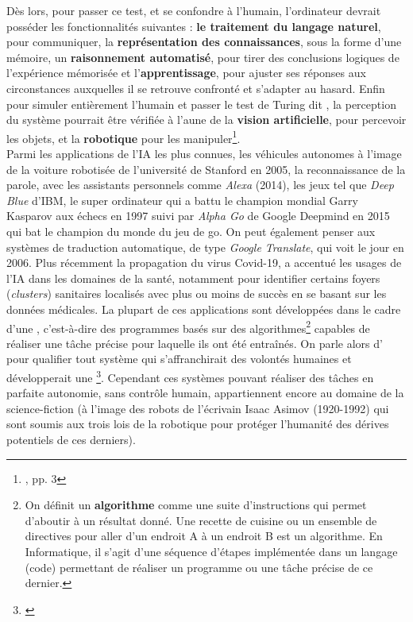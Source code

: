 Dès lors, pour passer ce test, et se confondre à l'humain, l'ordinateur devrait posséder les fonctionnalités suivantes : \textbf{le traitement du langage naturel}, pour communiquer, la \textbf{représentation des connaissances}, sous la forme d'une mémoire, un \textbf{raisonnement automatisé}, pour tirer des conclusions logiques de l'expérience mémorisée et l'\textbf{apprentissage}, pour ajuster ses réponses aux circonstances auxquelles il se retrouve confronté et s'adapter au hasard. Enfin pour simuler entièrement l'humain et passer le test de Turing dit , la perception du système pourrait être vérifiée à l'aune de la \textbf{vision artificielle}, pour percevoir les objets, et la \textbf{robotique} pour les manipuler\footnote{\cite{russell_intelligence_2010}, pp. 3}.\\

Parmi les applications de l'IA les plus connues, les véhicules autonomes à l'image de la voiture robotisée de l'université de Stanford en 2005, la reconnaissance de la parole, avec les assistants personnels comme \textit{Alexa} (2014), les jeux tel que \textit{Deep Blue} d'IBM, le super ordinateur qui a battu le champion mondial Garry Kasparov aux échecs en 1997 suivi par \textit{Alpha Go} de Google Deepmind en 2015  qui bat le champion du monde du jeu de go. On peut également penser aux systèmes de traduction automatique, de type \textit{Google Translate}, qui voit le jour en 2006. Plus récemment la propagation du virus Covid-19, a accentué les usages de l'IA dans les domaines de la santé, notamment pour identifier certains foyers (\textit{clusters}) sanitaires localisés avec plus ou moins de succès en se basant sur les données médicales.
\newpage
La plupart de ces applications sont développées dans le cadre d'une , c'est-à-dire des programmes basés sur des algorithmes\footnote{On définit un \textbf{algorithme} comme une suite d'instructions qui permet d'aboutir à un résultat donné. Une recette de cuisine ou un ensemble de directives pour aller d'un endroit A à un endroit B est un algorithme. En Informatique, il s'agit d'une séquence d'étapes implémentée dans un langage (code) permettant de réaliser un programme ou une tâche précise de ce dernier.} capables de réaliser une tâche précise pour laquelle ils ont été entraînés. On parle alors d' pour qualifier tout système qui s'affranchirait des volontés humaines et développerait une \footnote{\cite{ganascia_mythe_2017}}. Cependant ces systèmes pouvant réaliser des tâches en parfaite autonomie, sans contrôle humain, appartiennent encore au domaine de la science-fiction (à l'image des robots de l'écrivain Isaac Asimov (1920-1992) qui sont soumis aux trois lois de la robotique pour protéger l'humanité des dérives potentiels de ces derniers).\\ 

